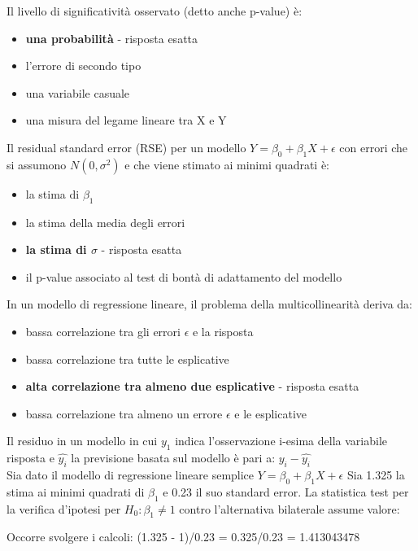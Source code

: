 Il livello di significatività osservato (detto anche p-value) è:

\begin{itemize}
\item \textbf{una probabilità} - risposta esatta
\item l'errore di secondo tipo
\item una variabile casuale
\item una misura del legame lineare tra X e Y
\end{itemize}

Il residual standard error (RSE) per un modello $Y = \beta_0 + \beta_1X + \epsilon$
con errori che si assumono $N(0,\sigma^2)$ e che viene stimato ai minimi quadrati è:

\begin{itemize}
\item la stima di $\beta_1$
\item la stima della media degli errori
\item \textbf{la stima di $\sigma$} - risposta esatta
\item il p-value associato al test di bontà di adattamento del modello
\end{itemize}

In un modello di regressione lineare, il problema della multicollinearità deriva da:

\begin{itemize}
\item bassa correlazione tra gli errori $\epsilon$ e la risposta
\item bassa correlazione tra tutte le esplicative
\item \textbf{alta correlazione tra almeno due esplicative} - risposta esatta
\item bassa correlazione tra almeno un errore $\epsilon$ e le esplicative
\end{itemize}

Il residuo in un modello in cui $y_1$ indica l’osservazione i-esima della variabile
risposta e $\hat{y_i}$ la previsione basata sul modello è pari a: $y_i - \hat{y_i}$\\

Sia dato il modello di regressione lineare semplice $Y = \beta_0 + \beta_1X + \epsilon$
Sia 1.325 la stima ai minimi quadrati di $\beta_1$ e 0.23 il suo standard error. 
La statistica test per la verifica d'ipotesi per $H_0 : \beta_1 \neq 1$ contro
l'alternativa bilaterale assume valore:

Occorre svolgere i calcoli: (1.325 - 1)/0.23 = 0.325/0.23 = 1.413043478\\

